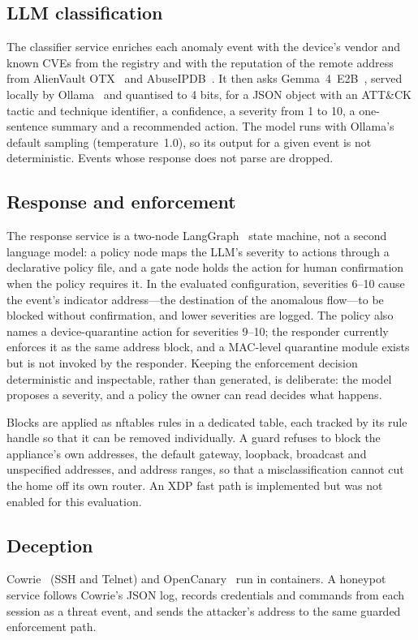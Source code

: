 \subsection{LLM classification}
The classifier service enriches each anomaly event with the device's vendor
and known CVEs from the registry and with the reputation of the remote address
from AlienVault OTX~\cite{otx} and AbuseIPDB~\cite{abuseipdb}. It then asks
Gemma~4~E2B~\cite{gemma4}, served locally by Ollama~\cite{ollama} and quantised
to 4 bits, for a JSON object with an ATT\&CK tactic and technique identifier,
a confidence, a severity from 1 to 10, a one-sentence summary and a
recommended action. The model runs with Ollama's default sampling
(temperature~1.0), so its output for a given event is not deterministic.
Events whose response does not parse are dropped.

\subsection{Response and enforcement}
The response service is a two-node LangGraph~\cite{langgraph} state machine,
not a second language model: a policy node maps the LLM's severity to actions
through a declarative policy file, and a gate node holds the action for human
confirmation when the policy requires it. In the evaluated configuration,
severities 6--10 cause the event's indicator address---the destination of the
anomalous flow---to be blocked without confirmation, and lower severities are
logged. The policy also names a device-quarantine action for severities 9--10;
the responder currently enforces it as the same address block, and a
MAC-level quarantine module exists but is not invoked by the responder. Keeping the enforcement decision deterministic and
inspectable, rather than generated, is deliberate: the model proposes a
severity, and a policy the owner can read decides what happens.

Blocks are applied as nftables rules in a dedicated table, each tracked by its
rule handle so that it can be removed individually. A guard refuses to block
the appliance's own addresses, the default gateway, loopback, broadcast and
unspecified addresses, and address ranges, so that a misclassification cannot
cut the home off its own router. An XDP fast path is implemented but was not
enabled for this evaluation.

\subsection{Deception}
Cowrie~\cite{cowrie} (SSH and Telnet) and OpenCanary~\cite{opencanary} run in
containers. A honeypot service follows Cowrie's JSON log, records credentials
and commands from each session as a threat event, and sends the attacker's
address to the same guarded enforcement path.

